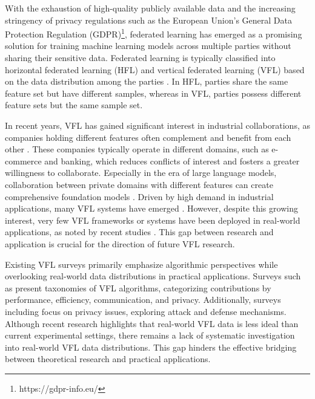 

With the exhaustion of high-quality publicly available data \cite{villalobos2022will} and the increasing stringency of privacy regulations such as the European Union’s General Data Protection Regulation (GDPR)\footnote{https://gdpr-info.eu/}, federated learning \cite{mcmahan2017communication} has emerged as a promising solution for training machine learning models across multiple parties without sharing their sensitive data. Federated learning is typically classified into horizontal federated learning (HFL) and vertical federated learning (VFL) based on the data distribution among the parties \cite{yang2019federated}. In HFL, parties share the same feature set but have different samples, whereas in VFL, parties possess different feature sets but the same sample set.

In recent years, VFL has gained significant interest in industrial collaborations, as companies holding different features often complement and benefit from each other \cite{li2020review}. These companies typically operate in different domains, such as e-commerce and banking, which reduces conflicts of interest and fosters a greater willingness to collaborate. Especially in the era of large language models, collaboration between private domains with different features can create comprehensive foundation models \cite{zheng2023input}. Driven by high demand in industrial applications, many VFL systems have emerged \cite{liu2021fate,li2023fedtree}. However, despite this growing interest, very few VFL frameworks or systems have been deployed in real-world applications, as noted by recent studies \cite{khan2022vertical,ye2024vertical}. This gap between research and application is crucial for the direction of future VFL research.

Existing VFL surveys primarily emphasize algorithmic perspectives while overlooking real-world data distributions in practical applications. Surveys such as \cite{liu2024vertical,khan2022vertical,cui2024survey,ye2024vertical} present taxonomies of VFL algorithms, categorizing contributions by performance, efficiency, communication, and privacy. Additionally, surveys including \cite{liu2024label,li2023vertical,yu2024survey} focus on privacy issues, exploring attack and defense mechanisms. Although recent research \cite{nock2021impact,wu2022coupled} highlights that real-world VFL data is less ideal than current experimental settings, there remains a lack of systematic investigation into real-world VFL data distributions. This gap hinders the effective bridging between theoretical research and practical applications.

